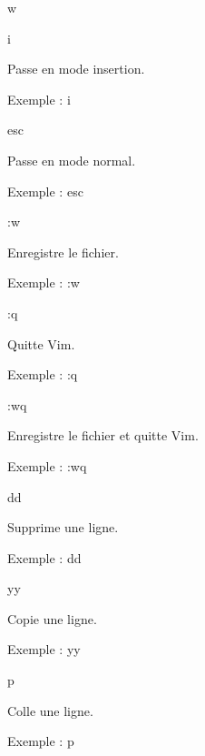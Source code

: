 w
\begin{DoxyEnumerate}
\item {\ttfamily i}
\begin{DoxyItemize}
\item Passe en mode insertion.
\item Exemple \+: {\ttfamily i}
\end{DoxyItemize}
\item {\ttfamily esc}
\begin{DoxyItemize}
\item Passe en mode normal.
\item Exemple \+: {\ttfamily esc}
\end{DoxyItemize}
\item {\ttfamily \+:w}
\begin{DoxyItemize}
\item Enregistre le fichier.
\item Exemple \+: {\ttfamily \+:w}
\end{DoxyItemize}
\item {\ttfamily \+:q}
\begin{DoxyItemize}
\item Quitte Vim.
\item Exemple \+: {\ttfamily \+:q}
\end{DoxyItemize}
\item {\ttfamily \+:wq}
\begin{DoxyItemize}
\item Enregistre le fichier et quitte Vim.
\item Exemple \+: {\ttfamily \+:wq}
\end{DoxyItemize}
\item {\ttfamily dd}
\begin{DoxyItemize}
\item Supprime une ligne.
\item Exemple \+: {\ttfamily dd}
\end{DoxyItemize}
\item {\ttfamily yy}
\begin{DoxyItemize}
\item Copie une ligne.
\item Exemple \+: {\ttfamily yy}
\end{DoxyItemize}
\item {\ttfamily p}
\begin{DoxyItemize}
\item Colle une ligne.
\item Exemple \+: {\ttfamily p}
\end{DoxyItemize}

\end{DoxyEnumerate}

